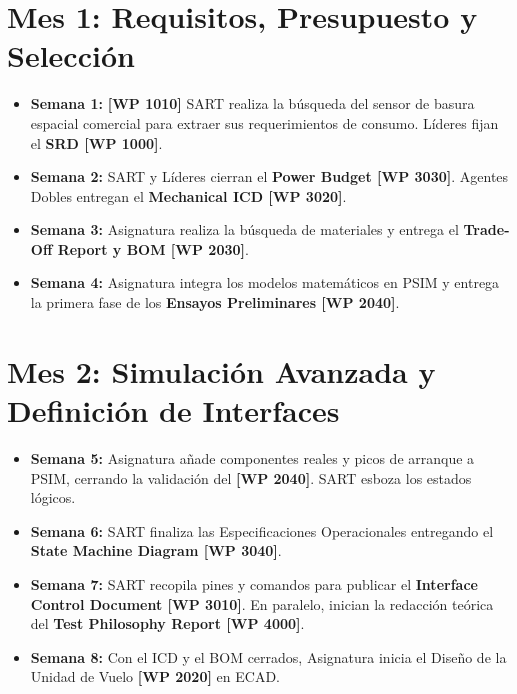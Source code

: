
\section{Mes 1: Requisitos, Presupuesto y Selección}
\begin{itemize}
    \item \textbf{Semana 1:} \textbf{[WP 1010]} SART realiza la búsqueda del sensor de basura espacial comercial para extraer sus requerimientos de consumo. Líderes fijan el \textbf{SRD [WP 1000]}.
    \item \textbf{Semana 2:} SART y Líderes cierran el \textbf{Power Budget [WP 3030]}. Agentes Dobles entregan el \textbf{Mechanical ICD [WP 3020]}.
    \item \textbf{Semana 3:} Asignatura realiza la búsqueda de materiales y entrega el \textbf{Trade-Off Report y BOM [WP 2030]}. 
    \item \textbf{Semana 4:} Asignatura integra los modelos matemáticos en PSIM y entrega la primera fase de los \textbf{Ensayos Preliminares [WP 2040]}.
\end{itemize}

\section{Mes 2: Simulación Avanzada y Definición de Interfaces}
\begin{itemize}
    \item \textbf{Semana 5:} Asignatura añade componentes reales y picos de arranque a PSIM, cerrando la validación del \textbf{[WP 2040]}. SART esboza los estados lógicos.
    \item \textbf{Semana 6:} SART finaliza las Especificaciones Operacionales entregando el \textbf{State Machine Diagram [WP 3040]}. 
    \item \textbf{Semana 7:} SART recopila pines y comandos para publicar el \textbf{Interface Control Document [WP 3010]}. En paralelo, inician la redacción teórica del \textbf{Test Philosophy Report [WP 4000]}.
    \item \textbf{Semana 8:} Con el ICD y el BOM cerrados, Asignatura inicia el Diseño de la Unidad de Vuelo \textbf{[WP 2020]} en ECAD.
\end{itemize}

